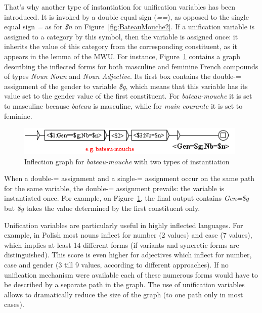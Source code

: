 \bigskip
\noindent That's why another type of instantiation for unification variables has been introduced. 
It is invoked by a double equal sign (\emph{==}), as opposed to the 
single equal sign \emph{=} as for \emph{\$n} on Figure~\ref{fig:BateauMouche2}. 
If a unification variable is assigned to a category by this symbol, then the variable is assigned once: it
inherits the value of this category from the corresponding constituent, as it appears in the lemma of 
the MWU. For instance, Figure~\ref{fig:BateauMouche3} contains a graph describing the inflected 
forms for both masculine and feminine French compounds of types \emph{Noun Noun} and 
\emph{Noun Adjective}. Its first box contains the double-= assignment of the gender to variable 
\emph{\$g}, which means that this variable has its value set to the gender value of the first 
constituent. For \emph{bateau-mouche} it is set to masculine because \emph{bateau} is 
masculine, while for \emph{main courante} it is set to feminine. 

\begin{figure}[!htb]
  \centering
  \includegraphics[width=11cm]{resources/img/BateauMouche3.png}
  \caption{Inflection graph for \emph{bateau-mouche} with two types of instantiation}
  \label{fig:BateauMouche3}
\end{figure}

\bigskip
\noindent When a double-= assignment and a single-= assignment occur on the same path for the same variable,
the double-= assignment prevails: the variable is instantiated once.
For example, on Figure~\ref{fig:BateauMouche3}, 
the final output contains \emph{Gen=\$g} but \emph{\$g} takes the value determined by the 
first constituent only.

\bigskip
\noindent Unification variables are particularly useful in highly inflected languages. For 
example, in Polish most nouns inflect for number (2 values) and case (7 values), which implies 
at least 14 different forms (if variants and syncretic forms are distinguished). This score is 
even higher for adjectives which inflect for number, case and gender (3 till 9 values, according 
to different approaches). If no unification mechanism were available each of these numerous 
forms would have to be described by a separate path in the graph. The use of unification variables 
allows to dramatically reduce the size of the graph (to one path only in most cases). 

